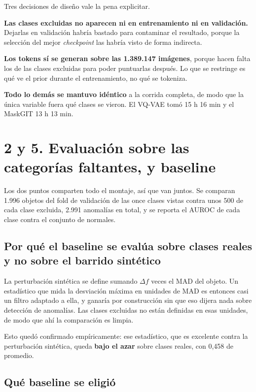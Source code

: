 \documentclass[11pt,a4paper]{article}
\begin{document}
Tres decisiones de diseño vale la pena explicitar.

\textbf{Las clases excluidas no aparecen ni en entrenamiento ni en validación.} Dejarlas en
validación habría bastado para contaminar el resultado, porque la selección del mejor
\textit{checkpoint} las habría visto de forma indirecta.

\textbf{Los tokens sí se generan sobre las 1.389.147 imágenes}, porque hacen falta los de
las clases excluidas para poder puntuarlas después. Lo que se restringe es qué ve el prior
durante el entrenamiento, no qué se tokeniza.

\textbf{Todo lo demás se mantuvo idéntico} a la corrida completa, de modo que la única
variable fuera qué clases se vieron. El VQ-VAE tomó 15 h 16 min y el MaskGIT 13 h 13 min.

\section*{2 y 5. Evaluación sobre las categorías faltantes, y baseline}

Los dos puntos comparten todo el montaje, así que van juntos. Se comparan 1.996 objetos del
fold de validación de las once clases vistas contra unos 500 de cada clase excluida, 2.991
anomalías en total, y se reporta el AUROC de cada clase contra el conjunto de normales.

\subsection*{Por qué el baseline se evalúa sobre clases reales y no sobre el barrido sintético}

La perturbación sintética se define sumando $\Delta f$ veces el MAD del objeto. Un
estadístico que mida la desviación máxima en unidades de MAD es entonces casi un filtro
adaptado a ella, y ganaría por construcción sin que eso dijera nada sobre detección de
anomalías. Las clases excluidas no están definidas en esas unidades, de modo que ahí la
comparación es limpia.

Esto quedó confirmado empíricamente: ese estadístico, que es excelente contra la
perturbación sintética, queda \textbf{bajo el azar} sobre clases reales, con 0,458 de
promedio.

\subsection*{Qué baseline se eligió}
\end{document}
